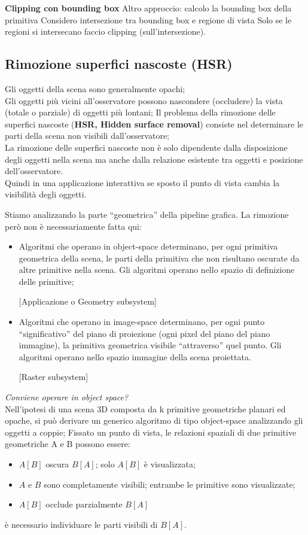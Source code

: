 \documentclass[a4paper, 10pt]{article}
\begin{document}
	\noindent
	\textbf{Clipping con bounding box}
	Altro approccio: calcolo la bounding box della primitiva
	Considero intersezione tra bounding box e regione di vista
	Solo se le regioni si intersecano faccio clipping
	(sull'intersezione).
	
	\subsection{Rimozione superfici nascoste (HSR)}
	Gli oggetti della scena sono generalmente opachi;\\
	Gli oggetti più vicini all’osservatore possono nascondere (occludere) la vista (totale o parziale) di oggetti più lontani; Il problema della rimozione delle superfici nascoste (\textbf{HSR, Hidden surface removal}) consiste nel determinare le parti della
	scena non visibili dall’osservatore;\\
	La rimozione delle superfici nascoste non è solo dipendente dalla disposizione degli oggetti nella scena ma anche dalla relazione esistente tra oggetti e posizione dell’osservatore.\\
	Quindi in una applicazione interattiva se sposto il punto di vista cambia la visibilità degli oggetti.
	
	\bigskip
	
	Stiamo analizzando la parte “geometrica” della pipeline grafica. La rimozione però non è necessariamente fatta qui:
	\begin{itemize}
		\item Algoritmi che operano in object-space determinano, per ogni primitiva geometrica della scena, le parti della primitiva che non risultano oscurate da altre primitive nella scena. Gli algoritmi operano nello spazio di definizione delle primitive;
		
		[Applicazione o Geometry subsystem]
		
		\item Algoritmi che operano in image-space determinano, per ogni punto “significativo” del piano di proiezione (ogni pixel del piano del piano immagine), la primitiva geometrica visibile “attraverso” quel punto. Gli algoritmi operano nello spazio immagine della scena proiettata.
		
		[Raster subsystem]
	\end{itemize}
	
	
	\textit{Conviene operare in object space?}\\
	Nell’ipotesi di una scena 3D composta da k primitive geometriche planari ed opache, si può derivare un generico algoritmo di tipo object-space analizzando gli oggetti a coppie;
	Fissato un punto di vista, le relazioni spaziali di due primitive geometriche A e B possono essere:
	\begin{itemize}
		\item $ A [B] $ oscura $ B [A] $; solo $ A [B] $ è visualizzata;
		\item $ A $ e $ B $ sono completamente visibili; entrambe le primitive sono
		visualizzate;
		\item $ A [B] $ occlude parzialmente $ B [A] $
	\end{itemize}
	è necessario individuare le parti visibili di $ B [A] $.
	
\end{document}
